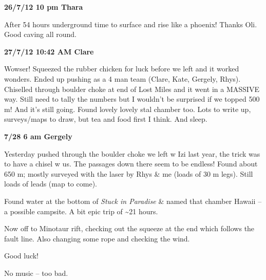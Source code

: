 \textbf{26/7/12 10 pm Thara}

After 54 hours underground time to surface and rise like a phoenix!
Thanks Oli. Good caving all round.

\textbf{27/7/12 10:42 AM Clare}

Wowser! Squeezed the rubber chicken for luck before we left and it
worked wonders. Ended up pushing as a 4 man team (Clare, Kate, Gergely,
Rhys). Chiselled through boulder choke at end of Lost Miles and it went
in a MASSIVE way. Still need to tally the numbers but I wouldn't be
surprised if we topped 500 m! And it's still going. Found lovely lovely
stal chamber too. Lots to write up, surveys/maps to draw, but tea and
food first I think. And sleep.

\textbf{7/28 6 am Gergely}

Yesterday pushed through the boulder choke we left w Izi last year, the
trick was to have a chisel w us. The passages down there seem to be
endless! Found about 650 m; mostly surveyed with the laser by Rhys \& me
(loads of 30 m legs). Still loads of leads (map to come).

Found water at the bottom of \emph{Stuck in Paradise} \& named that
chamber Hawaii -- a possible campsite. A bit epic trip of
\textasciitilde 21 hours.

Now off to Minotaur rift, checking out the squeeze at the end which
follows the fault line. Also changing some rope and checking the wind.

Good luck!

No music -- too bad.

